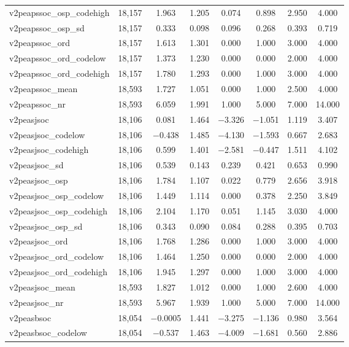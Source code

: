 \begin{table}[!htbp]
\begin{tabular}{@{\extracolsep{5pt}}lccccccc}
v2peapssoc\_osp\_codehigh & 18,157 & 1.963 & 1.205 & 0.074 & 0.898 & 2.950 & 4.000 \\ 
v2peapssoc\_osp\_sd & 18,157 & 0.333 & 0.098 & 0.096 & 0.268 & 0.393 & 0.719 \\ 
v2peapssoc\_ord & 18,157 & 1.613 & 1.301 & 0.000 & 1.000 & 3.000 & 4.000 \\ 
v2peapssoc\_ord\_codelow & 18,157 & 1.373 & 1.230 & 0.000 & 0.000 & 2.000 & 4.000 \\ 
v2peapssoc\_ord\_codehigh & 18,157 & 1.780 & 1.293 & 0.000 & 1.000 & 3.000 & 4.000 \\ 
v2peapssoc\_mean & 18,593 & 1.727 & 1.051 & 0.000 & 1.000 & 2.500 & 4.000 \\ 
v2peapssoc\_nr & 18,593 & 6.059 & 1.991 & 1.000 & 5.000 & 7.000 & 14.000 \\ 
v2peasjsoc & 18,106 & 0.081 & 1.464 & $-$3.326 & $-$1.051 & 1.119 & 3.407 \\ 
v2peasjsoc\_codelow & 18,106 & $-$0.438 & 1.485 & $-$4.130 & $-$1.593 & 0.667 & 2.683 \\ 
v2peasjsoc\_codehigh & 18,106 & 0.599 & 1.401 & $-$2.581 & $-$0.447 & 1.511 & 4.102 \\ 
v2peasjsoc\_sd & 18,106 & 0.539 & 0.143 & 0.239 & 0.421 & 0.653 & 0.990 \\ 
v2peasjsoc\_osp & 18,106 & 1.784 & 1.107 & 0.022 & 0.779 & 2.656 & 3.918 \\ 
v2peasjsoc\_osp\_codelow & 18,106 & 1.449 & 1.114 & 0.000 & 0.378 & 2.250 & 3.849 \\ 
v2peasjsoc\_osp\_codehigh & 18,106 & 2.104 & 1.170 & 0.051 & 1.145 & 3.030 & 4.000 \\ 
v2peasjsoc\_osp\_sd & 18,106 & 0.343 & 0.090 & 0.084 & 0.288 & 0.395 & 0.703 \\ 
v2peasjsoc\_ord & 18,106 & 1.768 & 1.286 & 0.000 & 1.000 & 3.000 & 4.000 \\ 
v2peasjsoc\_ord\_codelow & 18,106 & 1.464 & 1.250 & 0.000 & 0.000 & 2.000 & 4.000 \\ 
v2peasjsoc\_ord\_codehigh & 18,106 & 1.945 & 1.297 & 0.000 & 1.000 & 3.000 & 4.000 \\ 
v2peasjsoc\_mean & 18,593 & 1.827 & 1.012 & 0.000 & 1.000 & 2.600 & 4.000 \\ 
v2peasjsoc\_nr & 18,593 & 5.967 & 1.939 & 1.000 & 5.000 & 7.000 & 14.000 \\ 
v2peasbsoc & 18,054 & $-$0.0005 & 1.441 & $-$3.275 & $-$1.136 & 0.980 & 3.564 \\ 
v2peasbsoc\_codelow & 18,054 & $-$0.537 & 1.463 & $-$4.009 & $-$1.681 & 0.560 & 2.886 \\ 

\end{tabular}
\end{table}
